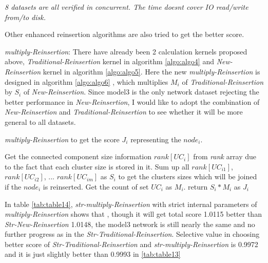 \documentclass{article}
\begin{document}
\begin{table}[!htbp]
\begin{adjustwidth}{-2cm}{}
\begin{threeparttable}
\begin{tabular}{|c|c|c|c|c|c|c|c|c|c|}
			\end{tabular}
			\begin{tablenotes}
				\small
				\item\textit{ 8 datasets are all verified in concurrent. The time doesn\textquotesingle t cover IO read/write from/to disk.}
			\end{tablenotes}			
		\end{threeparttable}
	\end{adjustwidth}	
	\end{table}
	 
	Other enhanced reinsertion algorithms are also tried to get the better score.
	 
	\begin{enumerate}
		
	\begin{item}
			
		\textit{multiply-Reinsertion}: There have already been 2 calculation kernels proposed above, \textit{Traditional-Reinsertion} kernel in algorithm \ref{algo:algo4} and \textit{New-Reinsertion} kernel in algorithm \ref{algo:algo5}. Here the new \textit{multiply-Reinsertion} is designed in algorithm \ref{algo:algo6} , which multiplies $M_i$ of \textit{Traditional-Reinsertion} by $S_i$ of \textit{New-Reinsertion}. Since model3 is the only network dataset rejecting the better performance in \textit{New-Reinsertion}, I would like to adopt the combination of \textit{New-Reinsertion} and \textit{Traditional-Reinsertion} to see whether it will be more general to all datasets.

		\begin{algorithm}[!htbp]
			\caption{ \textit{multiply-Reinsertion} to get the score $J_i$ representing the $node_i$. }
			\label{algo:algo6}
			\begin{algorithmic}[1]
				\State Get the connected component size information $rank[UC_{i}]$ from \textit{rank} array due to the fact that each cluster size is stored in it. Sum up all $rank[UC_{i1}]$, $rank[UC_{i2}]$, ... $rank[UC_{im}]$ as $S_i$ to get the clusters sizes which will be joined if the $node_i$ is reinserted.
				\State Get the count of set $UC_{i}$ as $M_i$.			
				\State return $S_i*M_i$ as $J_i$ 
			\end{algorithmic}
		\end{algorithm}	
		
		In table \ref{tab:table14}, \textit{str-multiply-Reinsertion} with strict internal parameters of \textit{multiply-Reinsertion} shows that , though it will get total score 1.0115 better than \textit{Str-New-Reinsertion} 1.0148, the model3 network is still nearly the same and no further progress as in the \textit{Str-Traditional-Reinsertion}. Selective value in choosing better score of \textit{Str-Traditional-Reinsertion} and \textit{str-multiply-Reinsertion} is 0.9972 and it is just slightly better than 0.9993 in \ref{tab:table13}


\end{item}
\end{enumerate}
\end{document}
